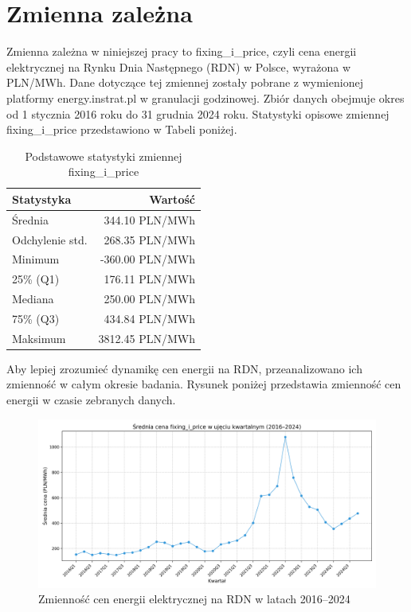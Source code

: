 \section{Zmienna zależna}
Zmienna zależna w niniejszej pracy to fixing\_i\_price, czyli cena energii elektrycznej na Rynku Dnia Następnego (RDN) w Polsce, wyrażona w PLN/MWh. Dane dotyczące tej zmiennej zostały pobrane z wymienionej platformy energy.instrat.pl w granulacji godzinowej. Zbiór danych obejmuje okres od 1 stycznia 2016 roku do 31 grudnia 2024 roku. Statystyki opisowe zmiennej fixing\_i\_price przedstawiono w Tabeli poniżej. 
\begin{table}[H]
    \centering
    \begin{tabular}{|l|r|}
    \hline
    \textbf{Statystyka} & \textbf{Wartość} \\ \hline
    Średnia             & 344.10 PLN/MWh   \\ \hline
    Odchylenie std.     & 268.35 PLN/MWh   \\ \hline
    Minimum             & -360.00 PLN/MWh  \\ \hline
    25\% (Q1)           & 176.11 PLN/MWh   \\ \hline
    Mediana             & 250.00 PLN/MWh   \\ \hline
    75\% (Q3)           & 434.84 PLN/MWh   \\ \hline
    Maksimum            & 3812.45 PLN/MWh  \\ \hline
    \end{tabular}
    \caption{Podstawowe statystyki zmiennej fixing\_i\_price}
    \label{tab:fixing-i-price-stats}
\end{table}

Aby lepiej zrozumieć dynamikę cen energii na RDN, przeanalizowano ich zmienność w całym okresie badania. Rysunek poniżej przedstawia zmienność cen energii w czasie zebranych danych.

\begin{figure}[H]
    \centering
    \includegraphics[width=\textwidth]{../plots/quarterly_fixing_i_price.png}
    \caption{Zmienność cen energii elektrycznej na RDN w latach 2016–2024}
    \label{fig:fixing-i-price-trend}
\end{figure}

